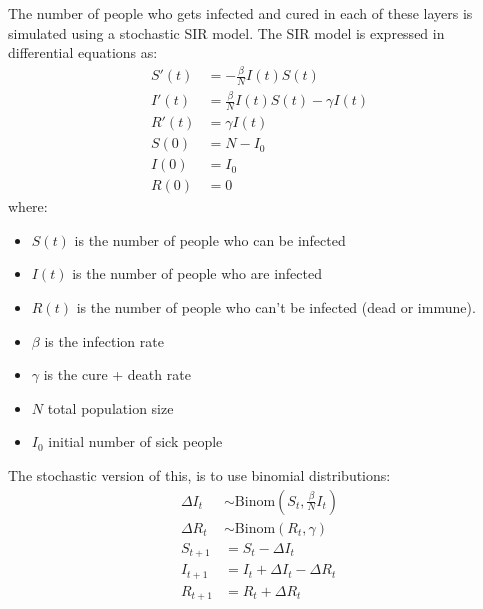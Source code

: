 \documentclass[a4paper]{article}
\begin{document}
The number of people who gets infected and cured in each of these layers is simulated using a stochastic SIR model. The SIR model is expressed in differential equations as:
\begin{equation}
\begin{aligned}
S'(t) &= -\frac{\beta}{N} I(t) S(t) \\
I'(t) &= \frac{\beta}{N} I(t) S(t)  - \gamma I(t) \\
R'(t) &= \gamma I(t) \\
S(0) &= N - I_0 \\
I(0) &= I_0 \\
R(0) &= 0
\end{aligned}
\end{equation}
where:
\begin{itemize}
\item $S(t)$ is the number of people who can be infected
\item $I(t)$ is the number of people who are infected
\item $R(t)$ is the number of people who can't be infected (dead or immune).
\item $\beta$ is the infection rate
\item $\gamma$ is the cure + death rate
\item $N$ total population size 
\item $I_0$ initial number of sick people
\end{itemize}

The stochastic version of this, is to use binomial distributions:
\begin{equation}
\begin{aligned}
\Delta I_t &\sim \text{Binom}(S_t, \frac{\beta}{N} I_t) \\
\Delta R_t &\sim \text{Binom}(R_t, \gamma) \\
S_{t+1} &= S_t - \Delta I_t \\
I_{t+1} &= I_t + \Delta I_t - \Delta R_t \\
R_{t+1} &= R_t + \Delta R_t \\
\end{aligned}
\end{equation}
\end{document}
